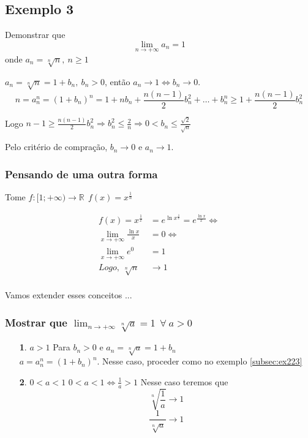 \documentclass[12pt,openany]{book}
\begin{document}
\subsection*{Exemplo 3}
\label{subsec:ex223}
\hspace{5mm}Demonstrar que $$\lim_{n \rightarrow +\infty} a_n = 1$$ onde $a_n = \sqrt[n]{n},\ n \geq 1$

$a_n = \sqrt[n]{n} = 1 + b_n, \ b_n > 0$, então $a_n \rightarrow 1 \Longleftrightarrow b_n \rightarrow 0$.
$$n = a_n^n =(1+ b_n)^n = 1 + nb_n + \frac{n(n-1)}{2}b_n^2 + \hdots + b_n^n \geq 1 + \frac{n(n-1)}{2}b_n^2$$

Logo $\displaystyle{n-1 \geq \frac{n(n-1)}{2}b_n^2 \Rightarrow b_n^2 \leq \frac{2}{n} \Rightarrow 0 < b_n \leq \frac{\sqrt{2}}{\sqrt{n}}}$

Pelo critério de compração, $b_n \rightarrow 0$ e $a_n \rightarrow 1$.

\subsubsection{Pensando de uma outra forma} Tome $f: [1;+\infty) \rightarrow \mathds{R} \ \ f(x) = x^{\frac{1}{n}}$

\begin{align*}
f(x) = x^{\frac{1}{x}} &= e^{\ln x^{\frac{1}{x}}} =   e^{\frac{\ln x}{x}} \Longleftrightarrow \\
\lim_{x \rightarrow +\infty} \frac{\ln x}{x} &= 0 \Longleftrightarrow \\
\lim_{x \rightarrow +\infty} e^0 &= 1 \\
Logo, \ \sqrt[n]{n} & \rightarrow 1 \\
\end{align*}

\vspace{10mm}
Vamos extender esses conceitos ...

\subsubsection {Mostrar que $\displaystyle{\lim_{n \rightarrow +\infty} \sqrt[n]{a}} = 1 \ \ \forall \ a > 0$}
\label{sssec:ss2232}
\begin{itemize}
\item [\textbf{1}. $ a > 1 $] Para $b_n > 0$ e $a_n = \sqrt[n]{a} = 1 + b_n$ \\ $a = a_n^n = (1 + b_n)^n$. Nesse caso, proceder como no exemplo \ref{subsec:ex223} 
\item [\textbf{2}. $ 0 < a < 1 $] $ 0 < a < 1 \Longleftrightarrow \frac{1}{a} > 1$ Nesse caso teremos que $$ \sqrt[n]{\frac{1}{a}} \rightarrow 1 $$ $$\frac{1}{\sqrt[n]{a}}\rightarrow 1 $$
\end{itemize}
\end{document}
